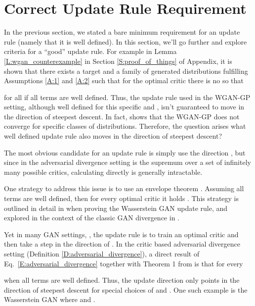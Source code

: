 \documentclass{article}
\begin{document}
 \section{Correct Update Rule Requirement}\label{S:update_rule}

 In the previous section, we stated a bare minimum requirement for an update rule (namely that it is well defined). In this section, we'll go further
 and explore criteria for a ``good'' update rule. For example in Lemma \ref{L:wgan_counterexample} in Section \ref{S:proof_of_things} of Appendix,
 it is shown that there exists a target  and
 a family of generated distributions  fulfilling Assumptions \ref{A:1} and \ref{A:2} such that for the optimal critic
  there is no  so that
 
 for all 
 if all terms are well defined.
 Thus, the update rule used in the WGAN-GP setting, although well defined for this specific  and ,
 isn't guaranteed to move  in the direction of steepest descent. In fact, \cite{mescheder2018which} shows that
 the WGAN-GP does not converge for specific classes of distributions.
 Therefore, the question arises what well defined update rule also moves  in the direction of steepest descent?

 The most obvious candidate for an update rule is simply use the direction ,
 but since in the adversarial divergence setting  is the supremum over a set of infinitely many possible critics,
 calculating  directly is generally intractable.

 One strategy to address this issue is to use an envelope theorem \cite{milgrom2002envelope}.
 Assuming all terms are well defined, then for every optimal critic 
 it holds .
 This strategy is outlined in detail in \cite{arjovsky2017wasserstein} when proving the Wasserstein GAN update rule,
 and explored in the context of the classic GAN divergence  in \cite{arjovsky2017towards}.

 Yet in many GAN settings,
 \cite{goodfellow2014generative,arjovsky2017wasserstein,salimans2016improved,petzka2017regularization},
 the update rule is to train an optimal critic  and then take a step in the direction of .
 In the critic based adversarial divergence setting (Definition \ref{D:adversarial_divergence}), a direct result of Eq.\ \ref{E:adversarial_divergence}
 together with Theorem 1 from \cite{milgrom2002envelope} is that for every 
 
 when all terms are well defined. Thus, the update direction  only points in the direction of steepest descent for special choices of  and .
 One such example is the Wasserstein GAN where  and .
\end{document}
